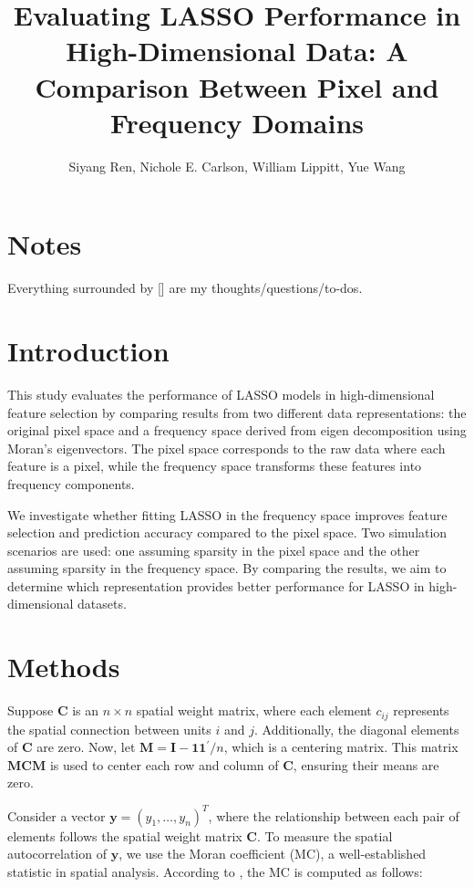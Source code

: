 \documentclass[12pt]{article}
\begin{document}
\title{Evaluating LASSO Performance in High-Dimensional Data: A Comparison Between Pixel and Frequency Domains}
\author{Siyang Ren, Nichole E. Carlson, William Lippitt, Yue Wang}
\date{}
\maketitle


\section*{Notes}

Everything surrounded by [] are my thoughts/questions/to-dos.


\section*{Introduction}

This study evaluates the performance of LASSO models in high-dimensional feature selection by comparing results from two different data representations: the original pixel space and a frequency space derived from eigen decomposition using Moran’s eigenvectors. The pixel space corresponds to the raw data where each feature is a pixel, while the frequency space transforms these features into frequency components.

We investigate whether fitting LASSO in the frequency space improves feature selection and prediction accuracy compared to the pixel space. Two simulation scenarios are used: one assuming sparsity in the pixel space and the other assuming sparsity in the frequency space. By comparing the results, we aim to determine which representation provides better performance for LASSO in high-dimensional datasets.


\section*{Methods}

Suppose \( \mathbf{C} \) is an \( n \times n \) spatial weight matrix, where each element \( c_{ij} \) represents the spatial connection between units \( i \) and \( j \). Additionally, the diagonal elements of \( \mathbf{C} \) are zero. Now, let \( \mathbf{M} = \mathbf{I} - \mathbf{1} \mathbf{1}^{\prime} / n \), which is a centering matrix. This matrix \( \mathbf{MCM} \) is used to center each row and column of \( \mathbf{C} \), ensuring their means are zero.

Consider a vector \( \mathbf{y} = \left( y_1, \dots, y_n \right)^T \), where the relationship between each pair of elements follows the spatial weight matrix \( \mathbf{C} \). To measure the spatial autocorrelation of \( \mathbf{y} \), we use the Moran coefficient (MC), a well-established statistic in spatial analysis. According to \citet{griffith2014spatial}, the MC is computed as follows:
\end{document}
